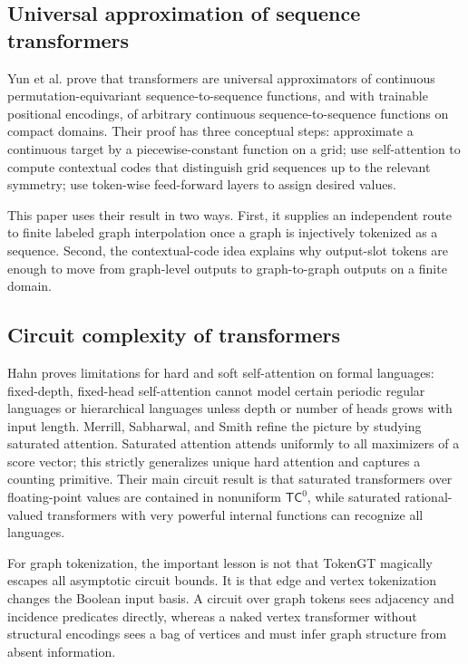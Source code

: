 \documentclass[11pt]{article}
\begin{document}
\subsection{Universal approximation of sequence transformers}

Yun et al. \cite{yun2020universal} prove that transformers are universal approximators of continuous permutation-equivariant sequence-to-sequence functions, and with trainable positional encodings, of arbitrary continuous sequence-to-sequence functions on compact domains.  Their proof has three conceptual steps: approximate a continuous target by a piecewise-constant function on a grid; use self-attention to compute contextual codes that distinguish grid sequences up to the relevant symmetry; use token-wise feed-forward layers to assign desired values.

This paper uses their result in two ways.  First, it supplies an independent route to finite labeled graph interpolation once a graph is injectively tokenized as a sequence.  Second, the contextual-code idea explains why output-slot tokens are enough to move from graph-level outputs to graph-to-graph outputs on a finite domain.

\subsection{Circuit complexity of transformers}

Hahn \cite{hahn2020limitations} proves limitations for hard and soft self-attention on formal languages: fixed-depth, fixed-head self-attention cannot model certain periodic regular languages or hierarchical languages unless depth or number of heads grows with input length.  Merrill, Sabharwal, and Smith \cite{merrill2022saturated} refine the picture by studying saturated attention.  Saturated attention attends uniformly to all maximizers of a score vector; this strictly generalizes unique hard attention and captures a counting primitive.  Their main circuit result is that saturated transformers over floating-point values are contained in nonuniform $\mathsf{TC}^0$, while saturated rational-valued transformers with very powerful internal functions can recognize all languages.

For graph tokenization, the important lesson is not that TokenGT magically escapes all asymptotic circuit bounds.  It is that edge and vertex tokenization changes the Boolean input basis.  A circuit over graph tokens sees adjacency and incidence predicates directly, whereas a naked vertex transformer without structural encodings sees a bag of vertices and must infer graph structure from absent information.
\end{document}
